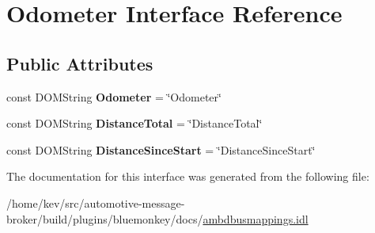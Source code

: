 \hypertarget{interfaceOdometer}{\section{Odometer Interface Reference}
\label{interfaceOdometer}
}
\subsection*{Public Attributes}
\begin{DoxyCompactItemize}
\item 
\hypertarget{interfaceOdometer_a64dd4e3b27833d0b6a3668ad518c6a8a}{const D\+O\+M\+String {\bfseries Odometer} = \char`\"{}Odometer\char`\"{}}\label{interfaceOdometer_a64dd4e3b27833d0b6a3668ad518c6a8a}

\item 
\hypertarget{interfaceOdometer_a3157bd000bfd509e9fd6d7c09b6e36ff}{const D\+O\+M\+String {\bfseries Distance\+Total} = \char`\"{}Distance\+Total\char`\"{}}\label{interfaceOdometer_a3157bd000bfd509e9fd6d7c09b6e36ff}

\item 
\hypertarget{interfaceOdometer_a0dd9d3f98892d11aadae694841237054}{const D\+O\+M\+String {\bfseries Distance\+Since\+Start} = \char`\"{}Distance\+Since\+Start\char`\"{}}\label{interfaceOdometer_a0dd9d3f98892d11aadae694841237054}

\end{DoxyCompactItemize}


The documentation for this interface was generated from the following file\+:\begin{DoxyCompactItemize}
\item 
/home/kev/src/automotive-\/message-\/broker/build/plugins/bluemonkey/docs/\hyperlink{ambdbusmappings_8idl}{ambdbusmappings.\+idl}\end{DoxyCompactItemize}
